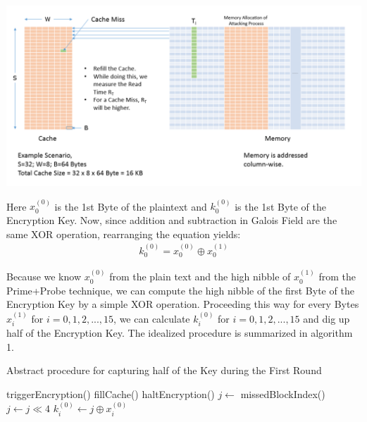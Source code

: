 \begin{center}
\includegraphics[scale=0.4,natwidth=1159,natheight=589]{Figures/probe(new).png}
\label{fig: Demonstration of the Probe phase.}
\end{center}

Here $x_0^{(0)}$ is the 1st Byte of the plaintext and $k_0^{(0)}$ is the 1st Byte of the Encryption Key. Now, since addition and subtraction in Galois Field are the same XOR operation, rearranging the equation yields:
\begin{align*}
k_0^{(0)}=x_0^{(0)} \oplus x_0^{(1)}
\end{align*}

Because we know $x_0^{(0)}$ from the plain text and the high nibble of $x_0^{(1)}$ from the Prime+Probe technique, we can compute the high nibble of the first Byte of the Encryption Key by a simple XOR operation. Proceeding this way for every Bytes $x_i^{(1)}$ for $i=0,1,2,...,15$, we can calculate $k_i^{(0)}$ for $i=0,1,2,...,15$ and dig up half of the Encryption Key. The idealized procedure is summarized in algorithm 1.

\begin{algorithm}
\caption{Abstract procedure for capturing half of the Key during the First Round}
\label{Abstract procedure for capturing half of the Key during the First Round}
\begin{algorithmic}[1]
	\State triggerEncryption()
		\State fillCache()
		\State haltEncryption()
		\State $j \gets$ missedBlockIndex()
		\State $j \gets j\ll 4$
		\State $k_i^{(0)} \gets j \oplus x_i^{(0)}$
	\EndFor
\end{algorithmic}
\end{algorithm}
